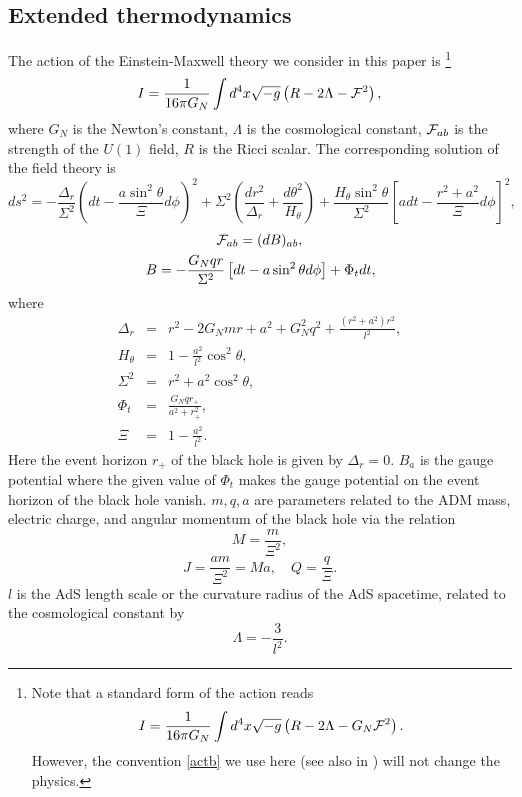 \documentclass[a4paper,11pt]{article}
\newcommand{\nn}{\nonumber}
\begin{document}
\subsection{Extended thermodynamics}
The action of the Einstein-Maxwell theory we consider in this paper is \footnote{Note that a standard form of the action reads \begin{equation}
I=\frac{1}{16 \pi G_N} \int d^{4} x \sqrt{-g}\left(R-2 \Lambda-G_N \mathcal{F}^2\right).
\end{equation} However, the convention \eqref{actb} we use here (see also in \cite{Chamblin:1999tk}) will not change the physics.}
\begin{equation}\label{actb}
I=\frac{1}{16 \pi G_N} \int d^{4} x \sqrt{-g}\left(R-2 \Lambda-\mathcal{F}^2\right),
\end{equation}
where $G_N$ is the Newton's constant, $\Lambda$ is the cosmological constant, $\mathcal{F}_{ab}$ is the strength of the $U(1)$ field, $R$ is the Ricci scalar. The corresponding  solution of the field theory is
\begin{equation}\label{le}
ds^{2}=-\frac{\Delta_{r}}{\Sigma^2} \left(dt- \frac{a \sin^2\theta}{\Xi} d\phi \right)^2 +\Sigma^2  \left(\frac{dr^2}{\Delta_{r}}+\frac{d\theta^2}{H_\theta} \right)+ \frac{H_\theta \sin^2\theta}{\Sigma^2} \left[ a dt -\frac{r^2+a^2}{\Xi}d\phi\right]^2,
\end{equation}
\begin{gather}
\mathcal{F}_{ab}=(dB)_{ab},\\ \,B=-\frac{G_N qr}{\Sigma^2}\left[dt-a\sin^2\theta d\phi\right]+\Phi_t dt,
\end{gather}
where
\begin{eqnarray}
   \Delta_{r}&=&r^2-2G_N m r+a^2+G_N^2 q^2+\frac{(r^2+a^2)r^2}{l^2},\nn\\
   H_{\theta}&=&1-\frac{a^2}{l^2}\cos^2\theta,\nn\\
   \Sigma^2&=&r^{2}+a^{2}\cos^{2}\theta,\nn\\
   \Phi_t &=&\frac{G_N qr_+}{a^2+r_+^2},\nn\\
   \Xi&=&1-\frac{a^2}{l^2}.
\end{eqnarray}
Here the event horizon $r_+$ of the black hole is given by $\Delta_r=0$. $B_a$ is the gauge potential where the given value of $\Phi_t$ makes the gauge potential on the event horizon of the black hole vanish. $m, q, a$ are parameters related to the ADM mass, electric charge, and angular momentum of the black hole via the relation
\begin{equation}\label{main}
M=\frac{m}{\Xi^2},
\end{equation}
\begin{equation}\label{mjq}
 J=\frac{a m}{\Xi^2}=Ma,\quad Q=\frac{q}{\Xi}.
\end{equation}
$l$ is the AdS length scale or the curvature radius of the AdS spacetime, related to the cosmological constant by
\begin{equation}\label{lambl}
\Lambda=-\frac{3}{l^2}.
\end{equation}
\end{document}
